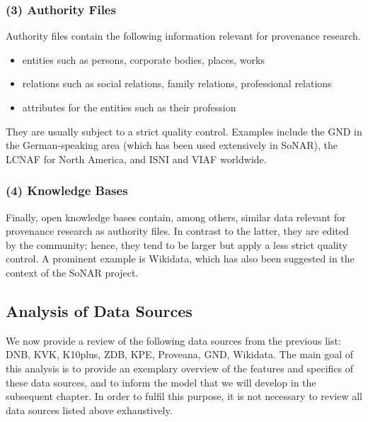\subsubsection{(3) Authority Files}

Authority files contain the following information relevant for provenance research.
%
\begin{itemize}
  \item
    entities such as persons, corporate bodies, places, works
  \item
    relations such as social relations, family relations, professional relations
  \item
    attributes for the entities such as their profession
\end{itemize}
%
They are usually subject to a strict quality control.
Examples include the \gls{GND} in the German-speaking area (which has been used extensively in \gls{SoNAR}),
the \gls{LCNAF} for North America,
and \gls{ISNI} and \gls{VIAF} worldwide.

\subsubsection{(4) Knowledge Bases}

Finally, open knowledge bases contain, among others, similar data relevant for provenance research as authority files.
In contrast to the latter, they are edited by the community; hence, they tend to be larger but apply
a less strict quality control. A prominent example is Wikidata, which has also been suggested in the context of the \gls{SoNAR} project.

\subsection{Analysis of Data Sources}

We now provide a review of the following data sources from the previous list:
\gls{DNB}, KVK, K10plus, \gls{ZDB}, \gls{KPE}, Proveana, \gls{GND}, Wikidata. 
The main goal of this analysis is to provide an exemplary overview of the features and specifics
of these data sources, and to inform the model that we will develop in the subsequent chapter.
In order to fulfil this purpose, it is not necessary to review all data sources listed above
exhaustively.

